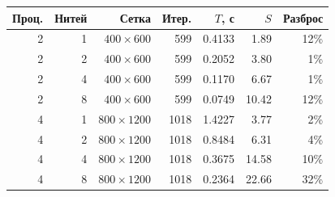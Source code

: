 \small
\begin{tabular}{rrrrrrr}
\toprule
Проц. & Нитей & Сетка & Итер. & $T$, с & $S$ & Разброс\\
\midrule
2 & 1 & $400\times600$ & 599 & 0.4133 & 1.89 & 12\%\\
2 & 2 & $400\times600$ & 599 & 0.2052 & 3.80 & 1\%\\
2 & 4 & $400\times600$ & 599 & 0.1170 & 6.67 & 1\%\\
2 & 8 & $400\times600$ & 599 & 0.0749 & 10.42 & 12\%\\
4 & 1 & $800\times1200$ & 1018 & 1.4227 & 3.77 & 2\%\\
4 & 2 & $800\times1200$ & 1018 & 0.8484 & 6.31 & 4\%\\
4 & 4 & $800\times1200$ & 1018 & 0.3675 & 14.58 & 10\%\\
4 & 8 & $800\times1200$ & 1018 & 0.2364 & 22.66 & 32\%\\
\bottomrule
\end{tabular}
